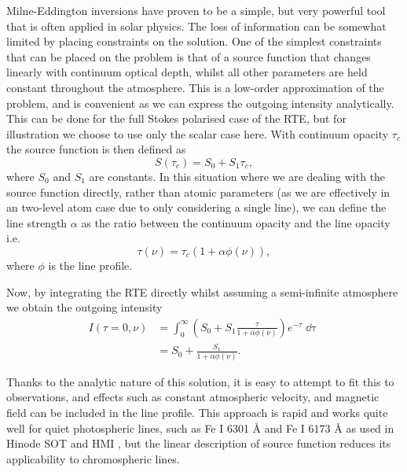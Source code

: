 Milne-Eddington inversions have proven to be a simple, but very powerful tool that is often applied in solar physics.
The loss of information can be somewhat limited by placing constraints on the solution. One of the simplest constraints that can be placed on the problem is that of a source function that changes linearly with continuum optical depth, whilst all other parameters are held constant throughout the atmosphere.
This is a low-order approximation of the problem, and is convenient as we can express the outgoing intensity analytically.
This can be done for the full Stokes polarised case of the RTE, but for illustration we choose to use only the scalar case here.
With continuum opacity $\tau_c$ the source function is then defined as
\begin{equation}
    S(\tau_c) = S_0 + S_1 \tau_c,
\end{equation}
where $S_0$ and $S_1$ are constants.
In this situation where we are dealing with the source function directly, rather than atomic parameters (as we are effectively in an two-level atom case due to only considering a single line), we can define the line strength $\alpha$ as the ratio between the continuum opacity and the line opacity i.e.
\begin{equation}
    \tau(\nu) = \tau_c (1 + \alpha \phi(\nu)),
\end{equation}
where $\phi$ is the line profile.

Now, by  integrating the RTE directly whilst assuming a semi-infinite atmosphere  we obtain the outgoing intensity
\begin{align}
I(\tau=0, \nu) &= \int_0^\infty \left(S_0 + S_1 \frac{\tau}{1+\alpha\phi(\nu)}\right) e^{-\tau} \mathop{\dd{}\tau}\\
               &= S_0 + \frac{S_1}{1 + \alpha\phi(\nu)}.
\end{align}

Thanks to the analytic nature of this solution, it is easy to attempt to fit this to observations, and effects such as constant atmospheric velocity, and magnetic field can be included in the line profile.
This approach is rapid and works quite well for quiet photospheric lines, such as Fe I 6301 \AA{} and Fe I 6173 \AA{} as used in Hinode SOT and HMI \citep[e.g.][]{Centeno2014}, but the linear description of source function reduces its applicability to chromospheric lines.

